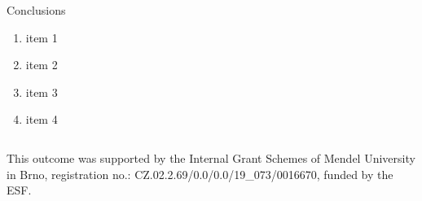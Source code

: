 \documentclass[final]{beamer}
\newlength{\sepwidth}
\newlength{\colwidth}
\newcommand{\separatorcolumn}{\begin{column}{\sepwidth}\end{column}}
\begin{document}
\begin{frame}[t]
\begin{columns}[t]
\begin{column}{\colwidth}
\begin{block}{Conclusions}
    \begin{enumerate}
        \item item 1
        \item item 2
        \item item 3
        \item item 4
    \end{enumerate}

\end{block}

\end{column}
\end{columns}


\begin{columns}[c]
\begin{column}{0.96\paperwidth}
    \small \centering This outcome was supported by the Internal Grant Schemes of Mendel University in Brno, registration no.: CZ.02.2.69/0.0/0.0/19\_073/0016670, funded by the ESF.
\end{column}
%
%
\end{columns}
\end{frame}
\end{document}
